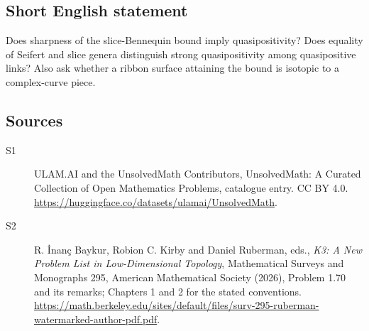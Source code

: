 \documentclass[11pt]{article}
\begin{document}
\subsection{Short English statement}
Does sharpness of the slice-Bennequin bound imply quasipositivity? Does equality of Seifert and slice genera distinguish strong quasipositivity among quasipositive links? Also ask whether a ribbon surface attaining the bound is isotopic to a complex-curve piece.
\subsection{Sources}
\begin{description}
\item[\hypertarget{source:statement:1}{S1}] ULAM.AI and the UnsolvedMath Contributors, UnsolvedMath: A Curated Collection of Open Mathematics Problems, catalogue entry. CC BY 4.0. \url{https://huggingface.co/datasets/ulamai/UnsolvedMath}.
\item[\hypertarget{source:statement:2}{S2}] R. İnanç Baykur, Robion C. Kirby and Daniel Ruberman, eds., \emph{K3: A New Problem List in Low-Dimensional Topology}, Mathematical Surveys and Monographs 295, American Mathematical Society (2026), Problem 1.70 and its remarks; Chapters 1 and 2 for the stated conventions. \url{https://math.berkeley.edu/sites/default/files/surv-295-ruberman-watermarked-author-pdf.pdf}.
\end{description}
\label{end:statement}
\end{document}
